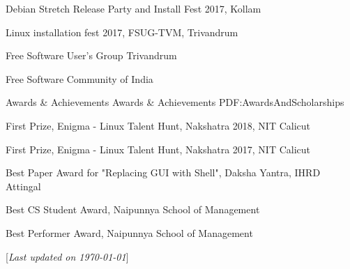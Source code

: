\documentclass[letterpaper,MMMyyyy,nonstopmode]{simpleresumecv}
\newcommand{\CVNote}{Last updated on {\today}}
\begin{document}
\begin{Body}
\BigGap
\BulletItem
Debian Stretch Release Party and Install Fest 2017, Kollam

\BigGap
\BulletItem
Linux installation fest 2017, FSUG-TVM, Trivandrum

\BigGap
\BulletItem
Free Software User's Group Trivandrum

\BigGap
\BulletItem
Free Software Community of India


\BigGap
\Section
{Awards \&\newline
Achievements}
{Awards \& Achievements}
{PDF:AwardsAndScholarships}

\BulletItem
First Prize, Enigma - Linux Talent Hunt,
Nakshatra 2018, NIT Calicut
\hfill
{}

\BigGap
\BulletItem
First Prize, Enigma - Linux Talent Hunt,
Nakshatra 2017, NIT Calicut
\hfill
{}

\BigGap
\BulletItem
Best Paper Award for "Replacing GUI with Shell",
Daksha Yantra, IHRD Attingal
\hfill
{}

\BigGap
\BulletItem
Best CS Student Award,
Naipunnya School of Management
\hfill
{}

\BigGap
\BulletItem
Best Performer Award,
Naipunnya School of Management
\hfill
{}


\end{Body}


\BigGap
\UseNoteFont%
\null\hfill%
[\textit{\CVNote}]
\end{document}
